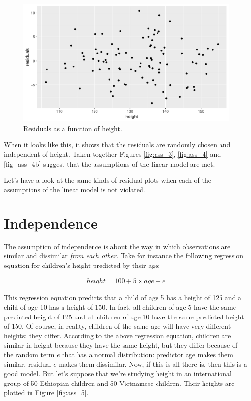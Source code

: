 \documentclass[]{book}\usepackage[]{graphicx}\usepackage[]{color}
\makeatletter
\def\maxwidth{ %
  \ifdim\Gin@nat@width>\linewidth
    \linewidth
  \else
    \Gin@nat@width
  \fi
}
\newenvironment{knitrout}{}{} %
\makeatother
\begin{document}
\begin{knitrout}
\color{fgcolor}\begin{figure}

{\centering \includegraphics[width=\maxwidth]{figure/ass_4b-1} 

}

\caption[Residuals as a function of height]{Residuals as a function of height.}\label{fig:ass_4b}
\end{figure}


\end{knitrout}


When it looks like this, it shows that the residuals are randomly chosen and independent of height. Taken together Figures \ref{fig:ass_3}, \ref{fig:ass_4} and \ref{fig_ass_4b} suggest that the assumptions of the linear model are met. 

Let's have a look at the same kinds of residual plots when each of the assumptions of the linear model is not violated.

\section{Independence}
The assumption of independence is about the way in which observations are similar and dissimilar \textit{from each other}. Take for instance the following regression equation for children's height predicted by their age:

\begin{eqnarray}
height = 100 + 5 \times age + e
\end{eqnarray}

This regression equation predicts that a child of age 5 has a height of 125 and a child of age 10 has a height of 150. In fact, all children of age 5 have the same predicted height of 125 and all children of age 10 have the same predicted height of 150. Of course, in reality, children of the same age will have very different heights: they differ. According to the above regression equation, children are similar in height because they have the same height, but they differ because of the random term $e$ that has a normal distribution: predictor age makes them similar, residual $e$ makes them dissimilar. Now, if this is all there is, then this is a good model. But let's suppose that we're studying height in an international group of 50 Ethiopian children and 50 Vietnamese children. Their heights are plotted in Figure \ref{fig:ass_5}.
\end{document}
